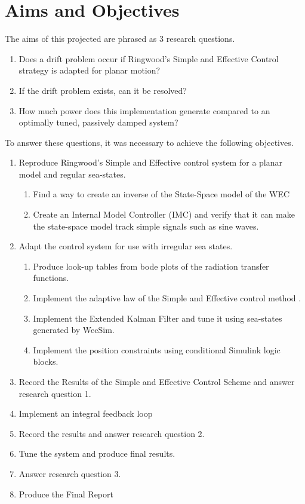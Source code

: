 \documentclass{report}
\begin{document}
\chapter{Aims and Objectives}
The aims of this projected are phrased as 3 research questions.
\begin{enumerate}
\item{Does a drift problem occur if Ringwood's Simple and Effective Control strategy is adapted for planar motion?}
\item{If the drift problem exists, can it be resolved?}
\item{How much power does this implementation generate compared to an optimally tuned, passively damped system?}
\end{enumerate}

To answer these questions, it was necessary to achieve the following objectives.

\begin{enumerate}
\item{Reproduce Ringwood's Simple and Effective control system for a planar model and regular sea-states.}
	\begin{enumerate}
		\item{Find a way to create an inverse of the State-Space model of the WEC}
		\item{Create an Internal Model Controller (IMC) and verify that it can make the state-space model track simple 			signals such as sine waves.}
	\end{enumerate}
\item{Adapt the control system for use with irregular sea states.}
	\begin{enumerate}
		\item{Produce look-up tables from bode plots of the radiation transfer functions.}
		\item{Implement the adaptive law of the Simple and Effective control method \cite{ringwood}.}
		\item{Implement the Extended Kalman Filter and tune it using sea-states generated by WecSim.}
		\item{Implement the position constraints using conditional Simulink logic blocks.}
	\end{enumerate}

\item{Record the Results of the Simple and Effective Control Scheme and answer research question 1.}
\item{Implement an integral feedback loop}
\item{Record the results and answer research question 2.}
\item{Tune the system and produce final results.}
\item{Answer research question 3.}
\item{Produce the Final Report}
\end{enumerate}
\end{document}
